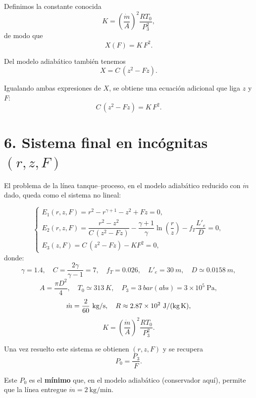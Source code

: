 \documentclass[11pt,a4paper]{article}
\begin{document}
Definimos la constante conocida
\[
K = \left(\frac{\dot m}{A}\right)^2
    \frac{R T_0}{P_3^2},
\]
de modo que
\[
X(F) = K\,F^2.
\]

Del modelo adiabático también tenemos
\[
X = C\,(z^2 - Fz).
\]

Igualando ambas expresiones de $X$, se obtiene una ecuación adicional que liga $z$ y $F$:
\[
C\,(z^2 - Fz) = K\,F^2.
\]

\section*{6. Sistema final en incógnitas \texorpdfstring{$(r,z,F)$}{(r,z,F)}}

El problema de la línea tanque--proceso, en el modelo adiabático reducido con $\dot m$ dado, queda como el sistema no lineal:

\[
\begin{cases}
E_1(r,z,F) = r^2 - r^{\gamma+1} - z^2 + Fz = 0,\\[6pt]
E_2(r,z,F) =
\dfrac{r^2 - z^2}{C\,(z^2 - Fz)}
- \dfrac{\gamma+1}{\gamma}\ln\left(\dfrac{r}{z}\right)
- f_T\dfrac{L'_e}{D} = 0,\\[10pt]
E_3(z,F) = C\,(z^2 - Fz) - K F^2 = 0,
\end{cases}
\]
donde:
\[
\gamma = 1.4,\quad
C = \frac{2\gamma}{\gamma-1} = 7,\quad
f_T = 0.026,\quad
L'_e = \SI{30}{m},\quad
D \simeq \SI{0.0158}{m},
\]
\[
A = \frac{\pi D^2}{4},\quad
T_0 \simeq \SI{313}{K},\quad
P_3 = \SI{3}{bar(abs)} = 3\times10^5\ \text{Pa},
\]
\[
\dot m = \frac{2}{60}\ \text{kg/s},\quad
R \approx 2.87\times10^2\ \text{J/(kg\,K)},
\]
\[
K = \left(\frac{\dot m}{A}\right)^2
      \frac{R T_0}{P_3^2}.
\]

Una vez resuelto este sistema se obtienen $(r,z,F)$ y se recupera
\[
P_0 = \frac{P_3}{F}.
\]

Este $P_0$ es el \textbf{mínimo} que, en el modelo adiabático (conservador aquí), permite que la línea entregue $\dot m = 2\ \text{kg/min}$.
\end{document}
